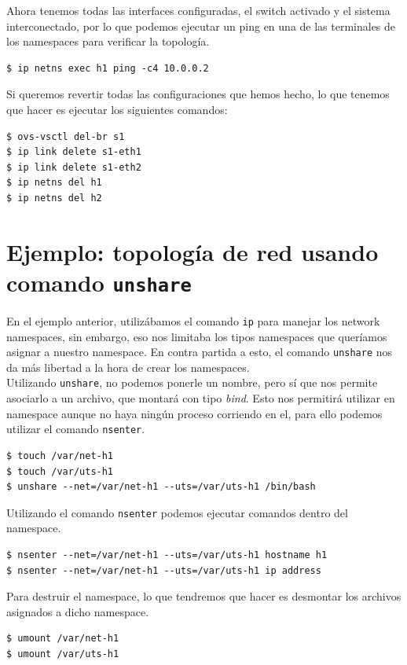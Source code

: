 \documentclass[a4paper, oneside, 12pt]{book}
\begin{document}
	\noindent Ahora tenemos todas las interfaces configuradas, el switch activado y el sistema interconectado, por lo que podemos ejecutar un ping en una de las terminales de los namespaces para verificar la topología.
	\begin{verbatim}
$ ip netns exec h1 ping -c4 10.0.0.2
	\end{verbatim}

	\noindent Si queremos revertir todas las configuraciones que hemos hecho, lo que tenemos que hacer es ejecutar los siguientes comandos:
	\begin{verbatim}
$ ovs-vsctl del-br s1
$ ip link delete s1-eth1
$ ip link delete s1-eth2
$ ip netns del h1
$ ip netns del h2
	\end{verbatim}

	\pagebreak

	\section[Ejemplo: topología de red con \texttt{unshare}]{Ejemplo: topología de red usando comando \texttt{unshare}}
	\noindent En el ejemplo anterior, utilizábamos el comando \texttt{ip} para manejar los network namespaces, sin embargo, eso nos limitaba los tipos namespaces que queríamos asignar a nuestro namespace. En contra partida a esto, el comando \texttt{unshare} nos da más libertad a la hora de crear los namespaces. \\
	
	\noindent Utilizando \texttt{unshare}, no podemos ponerle un nombre, pero sí que nos permite asociarlo a un archivo, que montará con tipo \textit{bind}. Esto nos permitirá utilizar en namespace aunque no haya ningún proceso corriendo en el, para ello podemos utilizar el comando \texttt{nsenter}.
	\begin{verbatim}
$ touch /var/net-h1
$ touch /var/uts-h1
$ unshare --net=/var/net-h1 --uts=/var/uts-h1 /bin/bash
	\end{verbatim}

	\noindent Utilizando el comando \texttt{nsenter} podemos ejecutar comandos dentro del namespace.
	\begin{verbatim}
$ nsenter --net=/var/net-h1 --uts=/var/uts-h1 hostname h1
$ nsenter --net=/var/net-h1 --uts=/var/uts-h1 ip address
	\end{verbatim}

	\noindent Para destruir el namespace, lo que tendremos que hacer es desmontar los archivos asignados a dicho namespace.
	\begin{verbatim}
$ umount /var/net-h1
$ umount /var/uts-h1
	\end{verbatim}
\end{document}
